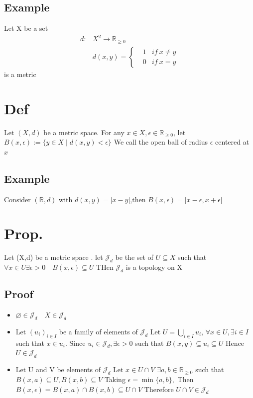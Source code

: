 \documentclass{book}
\begin{document}
\subsection{Example}
Let X be a set$$\begin{aligned}
    d:&X^2\rightarrow\mathbb{R} _{\geq0}\\ & d(x,y)=\left\{\begin{aligned}
    &1 & if\ x\not=y\\
    &0 & if\ x=y
    \end{aligned}\right.
\end{aligned}$$is a metric
\section{Def}
Let $(X,d)$ be a metric space. For any $x\in X,\epsilon \in \mathbb{R} _{\geq0}$, let $B(x,\epsilon):=\{y\in X\mid d(x,y)<\epsilon \}$ We call the open ball of radius $\epsilon$ centered at $x$
\subsection{Example}
Consider $(\mathbb{R} ,d)$ with $d(x,y)=\lvert x-y\rvert$,then $B(x,\epsilon)={]x-\epsilon,x+\epsilon[}$
\section{Prop.}
Let (X,d) be a metric space . let $\mathcal{J} _d$ be the set of $U\subseteq X$ such that $\forall x\in U\exists \epsilon >0\quad B(x,\epsilon)\subseteq U$ THen $\mathcal{J} _d$ is a topology on X
\subsection*{Proof}
\begin{itemize}
    \item $\varnothing\in \mathcal{J} _d\quad X\in \mathcal{J} _d$
    \item Let $(u_i)_{i\in I}$ be a family of elements of $\mathcal{J} _d$ Let $U=\bigcup\limits_{i\in I}u_i$, $\forall x\in U,\exists i\in I$ such that $x\in u_i$. Since $u_i\in \mathcal{J} _d,\exists \epsilon>0$ such that $B(x,y)\subseteq u_i\subseteq U$ Hence $U\in \mathcal{J} _d$
    \item Let U and V be elements of $\mathcal{J} _d$ Let $x\in U\cap V$ $\exists a,b\in \mathbb{R} _{\geq0}$ such that $B(x,a)\subseteq U, B(x,b)\subseteq V$ Taking $\epsilon=\min\{a,b\},$ Then $B(x,\epsilon)=B(x,a)\cap B(x,b)\subseteq U\cap V$ Therefore $U\cap V\in \mathcal{J} _d$ 
\end{itemize}
\end{document}
